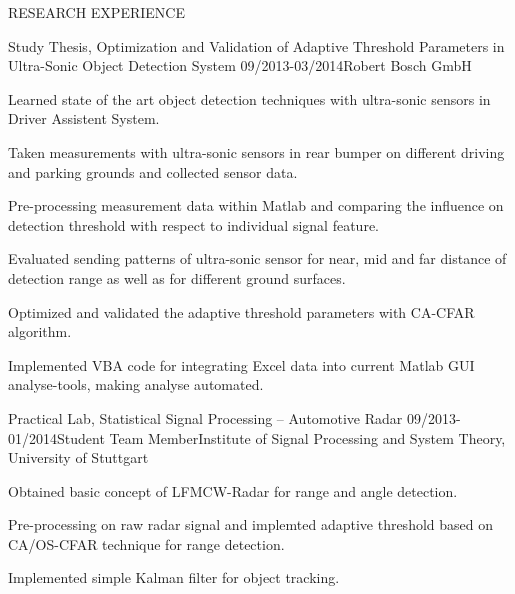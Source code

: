 \documentclass{resume} %
\begin{document}
\begin{rSection}{RESEARCH  EXPERIENCE}
\begin{rSubsection}{Study Thesis, Optimization and Validation of Adaptive Threshold Parameters in Ultra-Sonic Object Detection System 
}{09/2013-03/2014}{}{Robert Bosch GmbH}
\item Learned state of the art object detection techniques with ultra-sonic sensors in Driver Assistent System.
\item Taken measurements with ultra-sonic sensors in rear bumper on different driving and parking grounds and collected sensor data.
\item Pre-processing measurement data within Matlab and comparing the influence on detection threshold with respect to individual signal feature.
\item Evaluated sending patterns of ultra-sonic sensor for near, mid and far distance of detection range as well as for different ground surfaces.
\item Optimized and validated the adaptive threshold parameters with CA-CFAR algorithm.
\item Implemented VBA code for integrating Excel data into current Matlab GUI analyse-tools, making analyse automated. 
\end{rSubsection}


\begin{rSubsection}{Practical Lab, Statistical Signal Processing – Automotive Radar
}{09/2013-01/2014}{Student Team Member}{Institute of Signal Processing and System Theory, University of Stuttgart}

\item Obtained basic concept of LFMCW-Radar for range and angle detection.
\item Pre-processing on raw radar signal and implemted adaptive threshold based on CA/OS-CFAR technique for range detection.
\item Implemented simple Kalman filter for object tracking. 


\end{rSubsection}
\end{rSection}
\end{document}
